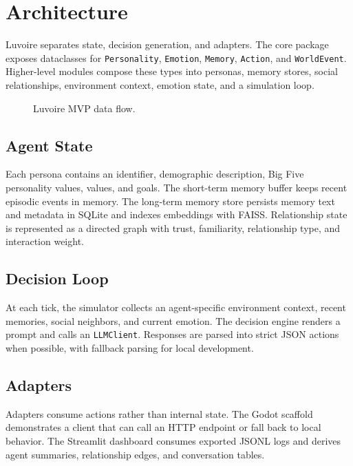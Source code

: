 \section{Architecture}

Luvoire separates state, decision generation, and adapters. The core package exposes dataclasses for \texttt{Personality}, \texttt{Emotion}, \texttt{Memory}, \texttt{Action}, and \texttt{WorldEvent}. Higher-level modules compose these types into personas, memory stores, social relationships, environment context, emotion state, and a simulation loop.

\begin{figure}[h]
\centering
{}
\caption{Luvoire MVP data flow.}
\end{figure}

\subsection{Agent State}

Each persona contains an identifier, demographic description, Big Five personality values, values, and goals. The short-term memory buffer keeps recent episodic events in memory. The long-term memory store persists memory text and metadata in SQLite and indexes embeddings with FAISS. Relationship state is represented as a directed graph with trust, familiarity, relationship type, and interaction weight.

\subsection{Decision Loop}

At each tick, the simulator collects an agent-specific environment context, recent memories, social neighbors, and current emotion. The decision engine renders a prompt and calls an \texttt{LLMClient}. Responses are parsed into strict JSON actions when possible, with fallback parsing for local development.

\subsection{Adapters}

Adapters consume actions rather than internal state. The Godot scaffold demonstrates a client that can call an HTTP endpoint or fall back to local behavior. The Streamlit dashboard consumes exported JSONL logs and derives agent summaries, relationship edges, and conversation tables.
